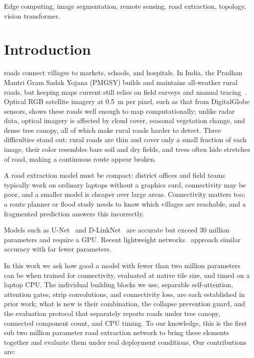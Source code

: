 \documentclass{ieeeaccess}
\begin{document}
\begin{keywords}
Edge computing, image segmentation, remote sensing, road extraction, topology, vision transformer.
\end{keywords}

\titlepgskip=-15pt

\maketitle

\section{Introduction}
\label{sec:introduction}

 roads connect villages to markets, schools, and hospitals. In India, the Pradhan Mantri Gram Sadak Yojana (PMGSY) builds and maintains all-weather rural roads, but keeping maps current still relies on field surveys and manual tracing~\cite{pmgsy}. Optical RGB satellite imagery at 0.5~m per pixel, such as that from DigitalGlobe sensors, shows these roads well enough to map computationally; unlike radar data, optical imagery is affected by cloud cover, seasonal vegetation change, and dense tree canopy, all of which make rural roads harder to detect. Three difficulties stand out: rural roads are thin and cover only a small fraction of each image, their color resembles bare soil and dry fields, and trees often hide stretches of road, making a continuous route appear broken.

A road extraction model must be compact: district offices and field teams typically work on ordinary laptops without a graphics card, connectivity may be poor, and a smaller model is cheaper over large areas. Connectivity matters too; a route planner or flood study needs to know which villages are reachable, and a fragmented prediction answers this incorrectly.

Models such as U-Net~\cite{ronneberger2015unet} and D-LinkNet~\cite{zhou2018dlinknet} are accurate but exceed 30 million parameters and require a GPU. Recent lightweight networks~\cite{cui2025hplnet} approach similar accuracy with far fewer parameters. 

In this work we ask how good a model with fewer than two million parameters can be when trained for connectivity, evaluated at native tile size, and timed on a laptop CPU. The individual building blocks we use, separable self-attention, attention gates, strip convolutions, and connectivity loss, are each established in prior work; what is new is their combination, the collapse prevention guard, and the evaluation protocol that separately reports roads under tree canopy, connected component count, and CPU timing. To our knowledge, this is the first sub two million parameter road extraction network to bring these elements together and evaluate them under real deployment conditions. Our contributions are:
\end{document}

